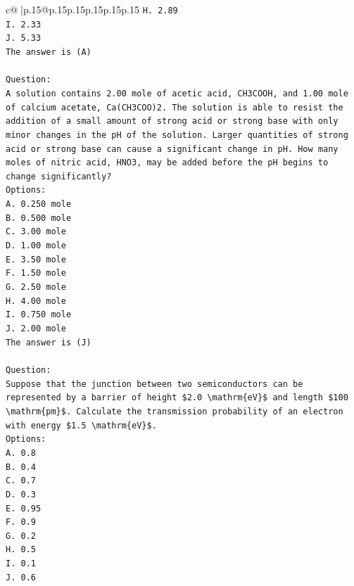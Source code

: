 \documentclass{article}
\begin{document}
{\begin{supertabular}{c@{$\;$}|p{.15\linewidth}@{}p{.15\linewidth}p{.15\linewidth}p{.15\linewidth}p{.15\linewidth}p{.15\linewidth}}
{{{\texttt{H. 2.89} \\
\texttt{I. 2.33} \\
\texttt{J. 5.33} \\
\texttt{The answer is (A)} \\
\\ 
\texttt{Question:} \\
\texttt{A solution contains 2.00 mole of acetic acid, CH3COOH, and 1.00 mole of calcium acetate, Ca(CH3COO)2. The solution is able to resist the addition of a small amount of strong acid or strong base with only minor changes in the pH of the solution. Larger quantities of strong acid or strong base can cause a significant change in pH. How many moles of nitric acid, HNO3, may be added before the pH begins to change significantly?} \\
\texttt{Options:} \\
\texttt{A. 0.250 mole} \\
\texttt{B. 0.500 mole} \\
\texttt{C. 3.00 mole} \\
\texttt{D. 1.00 mole} \\
\texttt{E. 3.50 mole} \\
\texttt{F. 1.50 mole} \\
\texttt{G. 2.50 mole} \\
\texttt{H. 4.00 mole} \\
\texttt{I. 0.750 mole} \\
\texttt{J. 2.00 mole} \\
\texttt{The answer is (J)} \\
\\ 
\texttt{Question:} \\
\texttt{Suppose that the junction between two semiconductors can be represented by a barrier of height \$2.0 \textbackslash{}mathrm\{eV\}\$ and length \$100 \textbackslash{}mathrm\{pm\}\$. Calculate the transmission probability of an electron with energy \$1.5 \textbackslash{}mathrm\{eV\}\$.} \\
\texttt{Options:} \\
\texttt{A.  0.8} \\
\texttt{B. 0.4} \\
\texttt{C. 0.7} \\
\texttt{D. 0.3} \\
\texttt{E. 0.95} \\
\texttt{F. 0.9} \\
\texttt{G. 0.2} \\
\texttt{H. 0.5} \\
\texttt{I. 0.1} \\
\texttt{J. 0.6} \\
            }
        }
    }
     \\ \\


\end{supertabular}}
\end{document}
